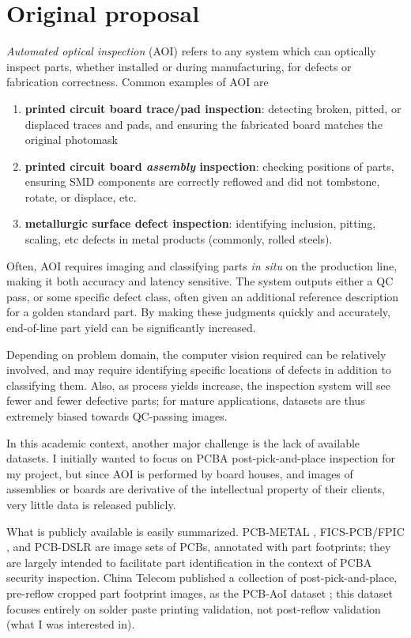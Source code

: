 \documentclass{article}
\begin{document}
\section{Original proposal}

\emph{Automated optical inspection} (AOI) refers to any system which can optically inspect parts, whether installed or during manufacturing, for defects or fabrication correctness. Common examples of AOI are
\begin{enumerate}
    \item \textbf{printed circuit board trace/pad inspection}: detecting broken, pitted, or displaced traces and pads, and ensuring the fabricated board matches the original photomask
    \item \textbf{printed circuit board \emph{assembly} inspection}: checking positions of parts, ensuring SMD components are correctly reflowed and did not tombstone, rotate, or displace, etc.
    \item \textbf{metallurgic surface defect inspection}: identifying inclusion, pitting, scaling, etc defects in metal products (commonly, rolled steels).
\end{enumerate}

Often, AOI requires imaging and classifying parts \emph{in situ} on the production line, making it both accuracy and latency sensitive. The system outputs either a QC pass, or some specific defect class, often given an additional reference description for a golden standard part. By making these judgments quickly and accurately, end-of-line part yield can be significantly increased.

Depending on problem domain, the computer vision required can be relatively involved, and may require identifying specific locations of defects in addition to classifying them.
Also, as process yields increase, the inspection system will see fewer and fewer defective parts; for mature applications, datasets are thus extremely biased towards QC-passing images.

In this academic context, another major challenge is the lack of available datasets. I initially wanted to focus on PCBA post-pick-and-place inspection for my project, but since AOI is performed by board houses, and images of assemblies or boards are derivative of the intellectual property of their clients, very little data is released publicly.

What is publicly available is easily summarized. PCB-METAL \cite{pcb-metal}, FICS-PCB/FPIC \cite{jessurun2022fpic,lu2020fics}, and PCB-DSLR \cite{pramerdorfer2015} are image sets of PCBs, annotated with part footprints; they are largely intended to facilitate part identification in the context of PCBA security inspection. China Telecom published a collection of post-pick-and-place, pre-reflow cropped part footprint images, as the PCB-AoI dataset \cite{pcb-aoi}; this dataset focuses entirely on solder paste printing validation, not post-reflow validation (what I was interested in).
\end{document}
